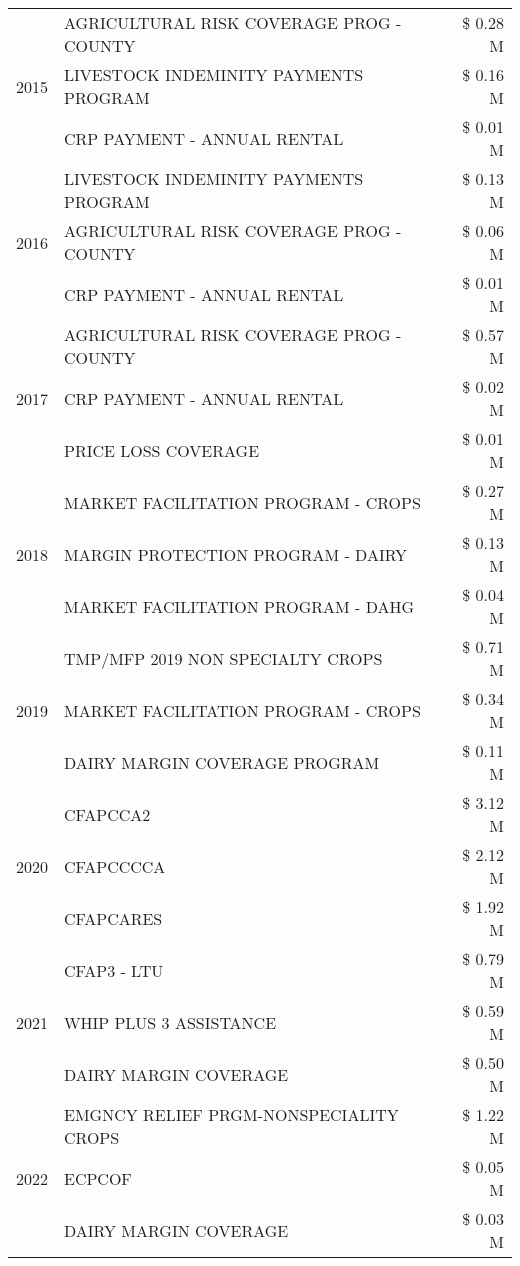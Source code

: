 \begin{tabular}{llr}
\cline{1-3}
\multirow[t]{3}{*}{2015} & AGRICULTURAL RISK COVERAGE PROG - COUNTY & \$ 0.28 M \\
 & LIVESTOCK INDEMINITY PAYMENTS PROGRAM & \$ 0.16 M \\
 & CRP PAYMENT - ANNUAL RENTAL & \$ 0.01 M \\
\cline{1-3}
\multirow[t]{3}{*}{2016} & LIVESTOCK INDEMINITY PAYMENTS PROGRAM & \$ 0.13 M \\
 & AGRICULTURAL RISK COVERAGE PROG - COUNTY & \$ 0.06 M \\
 & CRP PAYMENT - ANNUAL RENTAL & \$ 0.01 M \\
\cline{1-3}
\multirow[t]{3}{*}{2017} & AGRICULTURAL RISK COVERAGE PROG - COUNTY & \$ 0.57 M \\
 & CRP PAYMENT - ANNUAL RENTAL & \$ 0.02 M \\
 & PRICE LOSS COVERAGE & \$ 0.01 M \\
\cline{1-3}
\multirow[t]{3}{*}{2018} & MARKET FACILITATION PROGRAM - CROPS & \$ 0.27 M \\
 & MARGIN PROTECTION PROGRAM - DAIRY & \$ 0.13 M \\
 & MARKET FACILITATION PROGRAM - DAHG & \$ 0.04 M \\
\cline{1-3}
\multirow[t]{3}{*}{2019} & TMP/MFP 2019 NON SPECIALTY CROPS & \$ 0.71 M \\
 & MARKET FACILITATION PROGRAM - CROPS & \$ 0.34 M \\
 & DAIRY MARGIN COVERAGE PROGRAM & \$ 0.11 M \\
\cline{1-3}
\multirow[t]{3}{*}{2020} & CFAPCCA2 & \$ 3.12 M \\
 & CFAPCCCCA & \$ 2.12 M \\
 & CFAPCARES & \$ 1.92 M \\
\cline{1-3}
\multirow[t]{3}{*}{2021} & CFAP3 - LTU & \$ 0.79 M \\
 & WHIP PLUS 3 ASSISTANCE & \$ 0.59 M \\
 & DAIRY MARGIN COVERAGE & \$ 0.50 M \\
\cline{1-3}
\multirow[t]{3}{*}{2022} & EMGNCY RELIEF PRGM-NONSPECIALITY CROPS & \$ 1.22 M \\
 & ECPCOF & \$ 0.05 M \\
 & DAIRY MARGIN COVERAGE & \$ 0.03 M \\
\cline{1-3}
\bottomrule
\end{tabular}
